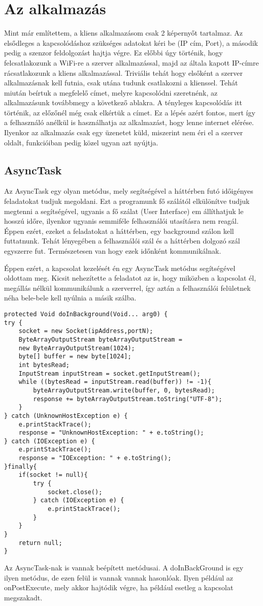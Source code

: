 \documentclass{thesis-ekf}
\theoremstyle{definition}
\theoremstyle{remark}
\begin{document}
\section{Az alkalmazás}
Mint már említettem, a kliens alkalmazásom csak 2 képernyőt tartalmaz. Az elsődleges a kapcsolódáshoz szükséges adatokat kéri be (IP cím, Port), a második pedig a szenzor feldolgozást hajtja végre. Ez előbbi úgy történik, hogy felcsatlakozunk a WiFi-re a szerver alkalmazással, majd az általa kapott IP-címre rácsatlakozunk a kliens alkalmazással. Triviális tehát hogy elsőként a szerver alkalmazásnak kell futnia, csak utána tudunk csatlakozni a klienssel. Tehát miután beírtuk a megfelelő címet, melyre kapcsolódni szeretnénk, az alkalmazásunk továbbmegy a következő ablakra. A tényleges kapcsolódás itt történik, az előzőnél még csak elkértük a címet. Ez a lépés azért fontos, mert így a felhasználó anélkül is használhatja az alkalmazást, hogy lenne internet elérése. Ilyenkor az alkalmazás csak egy üzenetet küld, miszerint nem éri el a szerver oldalt, funkcióiban pedig közel ugyan azt nyújtja.
\subsection{AsyncTask}
Az AsyncTask egy olyan metódus, mely segítségével a háttérben futó időigényes feladatokat tudjuk megoldani. Ezt a programunk fő szálától elkülönítve tudjuk megtenni a segítségével, ugyanis a fő szálat (User Interface) em állíthatjuk le hosszú időre, ilyenkor ugyanis semmiféle felhasználói utasításra nem reagál. Éppen ezért, ezeket a feladatokat a háttérben, egy background szálon kell futtatnunk. Tehát lényegében a felhasználói szál és a háttérben dolgozó szál egyszerre fut. Természetesen van hogy ezek időnként kommunikálnak. 
\par Éppen ezért, a kapcsolat kezelését én egy AsyncTask metódus segítségével oldottam meg. Kicsit nehezítette a feladatot az is, hogy miközben a kapcsolat él, megállás nélkül kommunikálunk a szerverrel, így aztán a felhasználói felületnek néha bele-bele kell nyúlnia a másik szálba.
\begin{lstlisting}
protected Void doInBackground(Void... arg0) {
try {
    socket = new Socket(ipAddress,portN);
    ByteArrayOutputStream byteArrayOutputStream =
    new ByteArrayOutputStream(1024);
    byte[] buffer = new byte[1024];
    int bytesRead;
    InputStream inputStream = socket.getInputStream();
    while ((bytesRead = inputStream.read(buffer)) != -1){
        byteArrayOutputStream.write(buffer, 0, bytesRead);
        response += byteArrayOutputStream.toString("UTF-8");
    }
} catch (UnknownHostException e) {
    e.printStackTrace();
    response = "UnknownHostException: " + e.toString();
} catch (IOException e) {
    e.printStackTrace();
    response = "IOException: " + e.toString();
}finally{
    if(socket != null){
        try {
            socket.close();
        } catch (IOException e) {
            e.printStackTrace();
        }
    }
}
    return null;
}
\end{lstlisting}
\par Az AsyncTask-nak is vannak beépített metódusai. A doInBackGround is egy ilyen metódus, de ezen felül is vannak vannak hasonlóak. Ilyen például az onPostExecute, mely akkor hajtódik végre, ha például esetleg a kapcsolat megszakadt.
\end{document}
